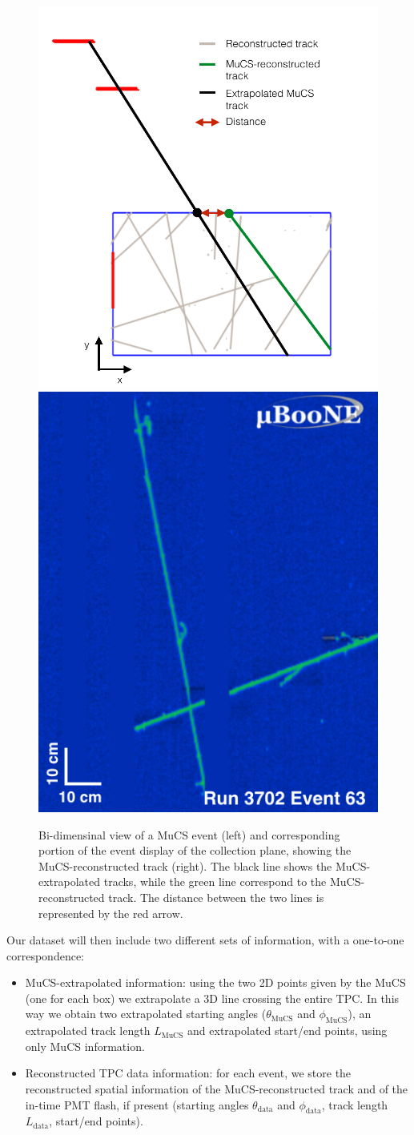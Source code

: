 \documentclass[a4paper]{scrartcl}
\begin{document}
\begin{figure}[htbp]
  \begin{center}
  \includegraphics[width=0.45\linewidth]{figures/evd.pdf}  \vspace{1.8em}\includegraphics[width=0.35\linewidth]{figures/evd_display.png}

  \caption{Bi-dimensinal view of a MuCS event (left) and corresponding portion of the event display of the collection plane, showing the MuCS-reconstructed track (right). The black line shows the MuCS-extrapolated tracks, while the green line correspond to the MuCS-reconstructed track. The distance between the two lines is represented by the red arrow.} \label{fig:evd}
\end{center}
\end{figure}

Our dataset will then include two different sets of information, with a one-to-one correspondence:
\begin{itemize}
  \item MuCS-extrapolated information: using the two 2D points given by the MuCS (one for each box) we extrapolate a 3D line crossing the entire TPC. In this way we obtain two extrapolated starting angles ($\theta_{\textrm{MuCS}}$ and $\phi_{\textrm{MuCS}}$), an extrapolated track length $L_{\textrm{MuCS}}$ and extrapolated start/end points, using only MuCS information.
  \item Reconstructed TPC data information: for each event, we store the reconstructed spatial information of the MuCS-reconstructed track and of the in-time PMT flash, if present (starting angles $\theta_{\textrm{data}}$ and $\phi_{\textrm{data}}$, track length $L_{\textrm{data}}$, start/end points).
\end{itemize}
\end{document}
